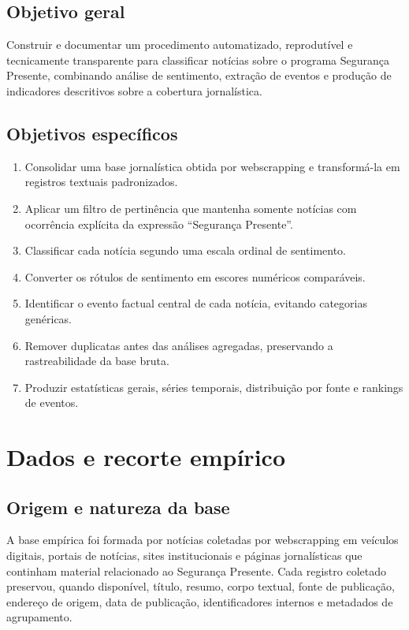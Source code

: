 \documentclass[12pt,a4paper]{article}
\begin{document}
\subsection{Objetivo geral}

Construir e documentar um procedimento automatizado, reprodutível e tecnicamente transparente para classificar notícias sobre o programa Segurança Presente, combinando análise de sentimento, extração de eventos e produção de indicadores descritivos sobre a cobertura jornalística.

\subsection{Objetivos específicos}

\begin{enumerate}
    \item Consolidar uma base jornalística obtida por webscrapping e transformá-la em registros textuais padronizados.
    \item Aplicar um filtro de pertinência que mantenha somente notícias com ocorrência explícita da expressão ``Segurança Presente''.
    \item Classificar cada notícia segundo uma escala ordinal de sentimento.
    \item Converter os rótulos de sentimento em escores numéricos comparáveis.
    \item Identificar o evento factual central de cada notícia, evitando categorias genéricas.
    \item Remover duplicatas antes das análises agregadas, preservando a rastreabilidade da base bruta.
    \item Produzir estatísticas gerais, séries temporais, distribuição por fonte e rankings de eventos.
\end{enumerate}

\section{Dados e recorte empírico}

\subsection{Origem e natureza da base}

A base empírica foi formada por notícias coletadas por webscrapping em veículos digitais, portais de notícias, sites institucionais e páginas jornalísticas que continham material relacionado ao Segurança Presente. Cada registro coletado preservou, quando disponível, título, resumo, corpo textual, fonte de publicação, endereço de origem, data de publicação, identificadores internos e metadados de agrupamento.
\end{document}
